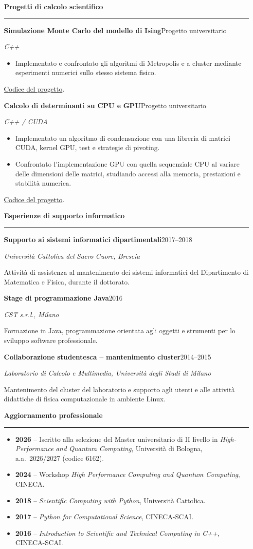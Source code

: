 \documentclass[10pt,a4paper]{article}
\newcommand{\cvsection}[1]{%
    \Needspace{4\baselineskip}%
    \vspace{0.8em}%
    {\large\bfseries\color{accent} #1}\par
    \vspace{0.2em}\hrule\vspace{0.45em}%
}
\newcommand{\entry}[4]{%
    \Needspace{4\baselineskip}%
    \textbf{#1}\hfill #2\par
    \textit{#3}\par
    #4\par\vspace{0.45em}%
}
\begin{document}
\newpage
\cvsection{Progetti di calcolo scientifico}
\entry{Simulazione Monte Carlo del modello di Ising}{Progetto universitario}{C++}{%
\begin{itemize}
    \item Implementato e confrontato gli algoritmi di Metropolis e a cluster mediante esperimenti numerici sullo stesso sistema fisico.
\end{itemize}
\href{https://github.com/MasterToninus/Computational-Physics-Exercise/tree/master/Ising\%20simulation\%20Metropolis\%20vs\%20Cluster}{Codice del progetto}.}
\entry{Calcolo di determinanti su CPU e GPU}{Progetto universitario}{C++ / CUDA}{%
\begin{itemize}
    \item Implementato un algoritmo di condensazione con una libreria di matrici CUDA, kernel GPU, test e strategie di pivoting.
    \item Confrontato l'implementazione GPU con quella sequenziale CPU al variare delle dimensioni delle matrici, studiando accessi alla memoria, prestazioni e stabilità numerica.
\end{itemize}
\href{https://github.com/MasterToninus/Computational-Physics-Exercise/tree/master/Condensation\%20Algorithm\%20in\%20CUDA}{Codice del progetto}.}

\cvsection{Esperienze di supporto informatico}
\entry{Supporto ai sistemi informatici dipartimentali}{2017--2018}{Università Cattolica del Sacro Cuore, Brescia}{%
Attività di assistenza al mantenimento dei sistemi informatici del Dipartimento di Matematica e Fisica, durante il dottorato.}
\entry{Stage di programmazione Java}{2016}{CST s.r.l., Milano}{%
Formazione in Java, programmazione orientata agli oggetti e strumenti per lo sviluppo software professionale.}
\entry{Collaborazione studentesca -- mantenimento cluster}{2014--2015}{Laboratorio di Calcolo e Multimedia, Università degli Studi di Milano}{%
Mantenimento del cluster del laboratorio e supporto agli utenti e alle attività didattiche di fisica computazionale in ambiente Linux.}

\cvsection{Aggiornamento professionale}
\begin{itemize}
    \item \textbf{2026} -- Iscritto alla selezione del Master universitario di II livello in \emph{High-Performance and Quantum Computing}, Università di Bologna, a.a.\ 2026/2027 (codice 6162).
    \item \textbf{2024} -- Workshop \emph{High Performance Computing and Quantum Computing}, CINECA.
    \item \textbf{2018} -- \emph{Scientific Computing with Python}, Università Cattolica.
    \item \textbf{2017} -- \emph{Python for Computational Science}, CINECA-SCAI.
    \item \textbf{2016} -- \emph{Introduction to Scientific and Technical Computing in C++}, CINECA-SCAI.
\end{itemize}
\end{document}
